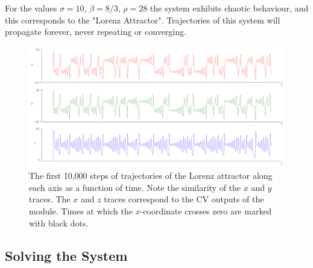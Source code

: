 \documentclass{tufte-handout}
\begin{document}
For the values $\sigma=10$, $\beta=8/3$, $\rho=28$ the system exhibits chaotic behaviour, and this corresponds to the "Lorenz Attractor". Trajectories of this system will propagate forever, never repeating or converging.



\begin{figure}[h]
  \includegraphics[width=\linewidth]{control_voltages.png}%
  \caption{The first 10,000 steps of trajectories of the Lorenz attractor along each axis as a function of time. Note the similarity of the $x$ and $y$ traces. The $x$ and $z$ traces correspond to the CV outputs of the module. Times at which the $x$-coordinate crosses zero are marked with black dots.}%
  \label{fig:control_voltages}%
\end{figure}









\subsection{Solving the System}\label{sec:solving_the_system}
\end{document}
